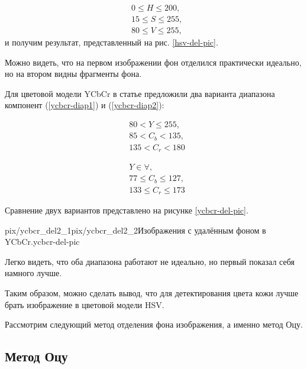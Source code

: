 $$
\begin{aligned}
	&0 \leq H \leq 200, \\
	&15 \leq S \leq 255, \\
	&80 \leq V \leq 255,
\end{aligned}
$$
и получим результат, представленный на рис. \ref{hsv-del-pic}.

Можно видеть, что на первом изображении фон отделился практически 
идеально, но на втором видны фрагменты фона.

\newpage


Для цветовой модели YCbCr в статье \cite{ycbcr-bib} предложили два 
варианта диапазона компонент (\ref{ycbcr-diap1}) и (\ref{ycbcr-diap2}):

\begin{equation}
	\begin{aligned}
		&80 < Y \leq 255, \\
		&85 < C_b < 135, \\
		&135 < C_r < 180 
	\end{aligned}
	\label{ycbcr-diap1}
\end{equation}

\begin{equation}
	\begin{aligned}
		&Y \in \forall,\\
		&77 \leq C_b \leq 127, \\
		&133 \leq C_r \leq 173 
	\end{aligned}
	\label{ycbcr-diap2}
\end{equation}

Сравнение двух вариантов представлено на рисунке \ref{ycbcr-del-pic}.

{pix/ycbcr_del2_1}{pix/ycbcr_del2_2}{Изображения с удалённым
фоном в YCbCr.}{ycbcr-del-pic}

Легко видеть, что оба диапазона работают не идеально, но первый 
показал себя намного лучше. 

Таким образом, можно сделать вывод, что для детектирования цвета кожи 
лучше брать изображение в цветовой модели HSV. 

Рассмотрим следующий метод отделения фона изображения, а именно метод
Оцу.

\subsection{Метод Оцу}


